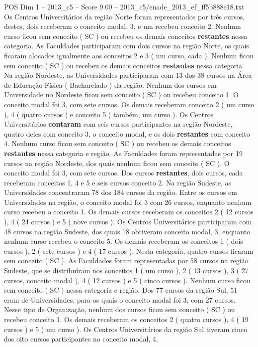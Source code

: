 \begin{textsample}{POS Dim 1 – 2013\_c5 – Score 9.00 – 2013\_c5/enade\_2013\_ef\_ff5b888e18.txt}
Os Centros Universitários da região Norte foram representados por três cursos, destes, dois receberam o conceito modal, 3, e um recebeu conceito 2.
Nenhum curso ficou sem conceito ( SC ) ou recebeu os demais conceitos \textbf{restantes} nessa categoria.
As Faculdades participaram com dois cursos na região Norte, os quais ficaram alocados igualmente aos conceitos 2 e 3 ( um curso, cada ).
Nenhum ficou sem conceito ( SC ) ou recebeu os demais conceitos \textbf{restantes} nessa categoria.
Na região Nordeste, as Universidades participaram com 13 dos 38 cursos na Área de Educação Física ( Bacharelado ) da região.
Nenhum dos cursos em Universidade no Nordeste ficou sem conceito ( SC ) ou recebeu conceito 1.
O conceito modal foi 3, com sete cursos.
Os demais receberam conceito 2 ( um curso ), 4 ( quatro cursos ) e conceito 5 ( também, um curso ).
Os Centros Universitários \textbf{contaram} com seis cursos participantes na região Nordeste, quatro deles com conceito 3, o conceito modal, e os dois \textbf{restantes} com conceito 4.
Nenhum curso ficou sem conceito ( SC ) ou recebeu os demais conceitos \textbf{restantes} nessa categoria e região.
As Faculdades foram representadas por 19 cursos na região Nordeste, dos quais nenhum ficou sem conceito ( SC ).
O conceito modal foi 3, com sete cursos.
Dos cursos \textbf{restantes}, dois cursos, cada receberam conceitos 1, 4 e 5 e seis cursos conceito 2.
Na região Sudeste, as Universidades concentraram 78 dos 184 cursos da região.
Entre os cursos em Universidades na região, o conceito modal foi 3 com 26 cursos, enquanto nenhum curso recebeu o conceito 1.
Os demais cursos receberam os conceitos 2 ( 12 cursos ), 4 ( 24 cursos ) e 5 ( nove cursos ).
Os Centros Universitários participaram com 48 cursos na região Sudeste, dos quais 18 obtiveram conceito modal, 3, enquanto nenhum curso recebeu o conceito 5.
Os demais receberam os conceitos 1 ( dois cursos ), 2 ( sete cursos ) e 4 ( 17 cursos ).
Nesta categoria, quatro cursos ficaram sem conceito ( SC ).
As Faculdades foram representadas por 58 cursos na região Sudeste, que se distribuíram nos conceitos 1 ( um curso ), 2 ( 13 cursos ), 3 ( 27 cursos, conceito modal ), 4 ( 12 cursos ) e 5 ( cinco cursos ).
Nenhum curso ficou sem conceito ( SC ) nessa categoria e região.
Dos 77 cursos da região Sul, 51 eram de Universidades, para os quais o conceito modal foi 3, com 27 cursos.
Nesse tipo de Organização, nenhum dos cursos ficou sem conceito ( SC ) ou recebeu conceito 1.
Os demais receberam os conceitos 2 ( quatro cursos ), 4 ( 19 cursos ) e 5 ( um curso ).
Os Centros Universitários da região Sul tiveram cinco dos oito cursos participantes no conceito modal, 4.

\end{textsample}
